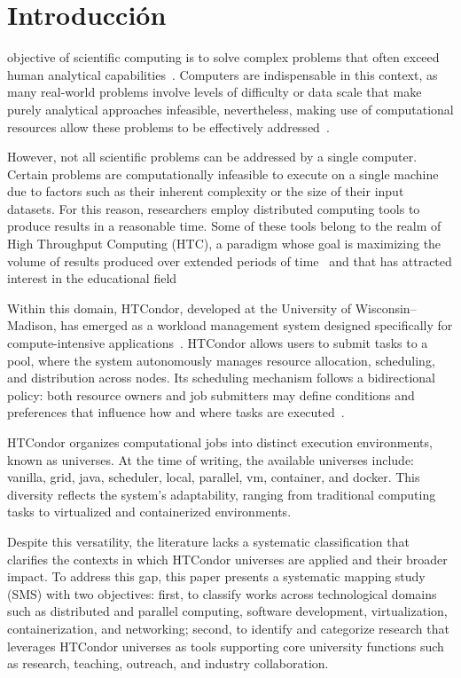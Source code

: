 \section{Introducción}
 objective of scientific computing is to solve complex problems that often exceed human analytical capabilities~\cite{landau01}. Computers are indispensable in this context, as many real-world problems involve levels of difficulty or data scale that make purely analytical approaches infeasible, nevertheless, making use of computational resources allow these problems to be effectively addressed~\cite{landau01}.


However, not all scientific problems can be addressed by a single computer. Certain problems are computationally infeasible to execute on a single machine due to factors such as their inherent complexity or the size of their input datasets. For this reason, researchers employ distributed computing tools to produce results in a reasonable time. Some of these tools belong to the realm of High Throughput Computing (HTC), a paradigm whose goal is maximizing the volume of results produced over extended periods of time~\cite{juve-01} and that has attracted interest in the educational field~\cite{Senol-01}


Within this domain, HTCondor, developed at the University of Wisconsin–Madison, has emerged as a workload management system designed specifically for compute-intensive applications~\cite{chang-01, htcondor-description}. HTCondor allows users to submit tasks to a pool, where the system autonomously manages resource allocation, scheduling, and distribution across nodes. Its scheduling mechanism follows a bidirectional policy: both resource owners and job submitters may define conditions and preferences that influence how and where tasks are executed~\cite{htcondor-description}.


HTCondor organizes computational jobs into distinct execution environments, known as universes. At the time of writing, the available universes include: vanilla, grid, java, scheduler, local, parallel, vm, container, and docker. This diversity reflects the system’s adaptability, ranging from traditional computing tasks to virtualized and containerized environments.


Despite this versatility, the literature lacks a systematic classification that clarifies the contexts in which HTCondor universes are applied and their broader impact. To address this gap, this paper presents a systematic mapping study (SMS) with two objectives: first, to classify works across technological domains such as distributed and parallel computing, software development, virtualization, containerization, and networking; second, to identify and categorize research that leverages HTCondor universes as tools supporting core university functions such as research, teaching, outreach, and industry collaboration.


